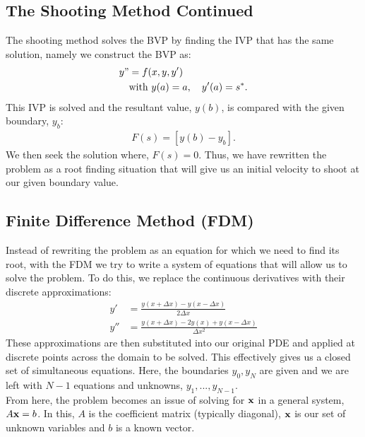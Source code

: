 \documentclass[11pt,a4paper]{report}
\begin{document}
	\subsection{The Shooting Method Continued}
	The shooting method solves the BVP by finding the IVP that has the same solution, namely we construct the BVP as:
	\begin{align}
	y" &= f(x,y,y')\\
	&\text{with } y(a)=a,\quad y'(a)=s^*.
	\end{align}
	This IVP is solved and the resultant value, $y(b)$, is compared with the given boundary, $y_b$:
	\begin{align}
	F(s) = [y(b) - y_b]. \label{wk8:shoot}
	\end{align}
	We then seek the solution where, $F(s)=0$. Thus, we have rewritten the problem as a root finding situation that will give us an initial velocity to shoot at our given boundary value.
	
	\subsection{Finite Difference Method (FDM)}
	Instead of rewriting the problem as an equation for which we need to find its root, with the FDM we try to write a system of equations that will allow us to solve the problem. To do this, we replace the continuous derivatives with their discrete approximations:
	\begin{align}
	y' &= \frac{y(x+\Delta x) - y(x-\Delta x)}{2\Delta x} \\
	y''&= \frac{y(x+\Delta x) - 2y(x) + y(x-\Delta x)}{\Delta x^2}
	\end{align}
	These approximations are then substituted into our original PDE and applied at discrete points across the domain to be solved. This effectively gives us a closed set of simultaneous equations. Here, the boundaries $y_0,y_N$ are given and we are left with $N-1$ equations and unknowns, $y_1,...,y_{N-1}$. \\
	
	From here, the problem becomes an issue of solving for $\mathbf{x}$ in a general system, $A\mathbf{x} = b$. In this, $A$ is the coefficient matrix (typically diagonal), $\mathbf{x}$ is our set of unknown variables and $b$ is a known vector.
	
\end{document}
